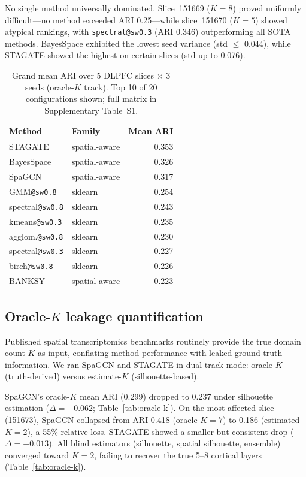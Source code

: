 \documentclass[]{bioinfo}
\begin{document}
No single method universally dominated. Slice~151669 (\(K=8\)) proved
uniformly difficult---no method exceeded ARI 0.25---while
slice~151670 (\(K=5\)) showed atypical rankings, with
\texttt{spectral@sw0.3} (ARI 0.346) outperforming all SOTA methods.
BayesSpace exhibited the lowest seed variance (std $\leq$ 0.044),
while STAGATE showed the highest on certain slices (std up to 0.076).

\begin{table}[!t]
\procemark
\caption{Grand mean ARI over 5 DLPFC slices $\times$ 3 seeds (oracle-$K$
track). Top 10 of 20 configurations shown; full matrix in Supplementary
Table~S1.\label{tab:dlpfc}}
\begin{tabular}{@{}llr@{}}
\toprule
Method & Family & Mean ARI \\
\midrule
STAGATE         & spatial-aware & 0.353 \\
BayesSpace      & spatial-aware & 0.326 \\
SpaGCN          & spatial-aware & 0.317 \\
GMM\texttt{@sw0.8} & sklearn   & 0.254 \\
spectral\texttt{@sw0.8} & sklearn & 0.243 \\
kmeans\texttt{@sw0.3}  & sklearn  & 0.235 \\
agglom.\texttt{@sw0.8} & sklearn  & 0.230 \\
spectral\texttt{@sw0.3} & sklearn & 0.227 \\
birch\texttt{@sw0.8}   & sklearn  & 0.226 \\
BANKSY          & spatial-aware & 0.223 \\
\bottomrule
\end{tabular}
\end{table}

\subsection{Oracle-$K$ leakage quantification}
\label{sec:oracle-k}

Published spatial transcriptomics benchmarks routinely provide the true
domain count \(K\) as input, conflating method performance with leaked
ground-truth information. We ran SpaGCN and STAGATE in dual-track mode:
oracle-\(K\) (truth-derived) versus estimate-\(K\) (silhouette-based).

SpaGCN's oracle-\(K\) mean ARI (0.299) dropped to 0.237 under silhouette
estimation ($\Delta = -0.062$; Table~\ref{tab:oracle-k}). On the most
affected slice (151673), SpaGCN collapsed from ARI 0.418 (oracle
\(K=7\)) to 0.186 (estimated \(K=2\)), a 55\% relative loss.
STAGATE showed a smaller but consistent drop ($\Delta = -0.013$). All
blind estimators (silhouette, spatial silhouette, ensemble) converged
toward \(K=2\), failing to recover the true 5--8 cortical layers
(Table~\ref{tab:oracle-k}).
\end{document}
